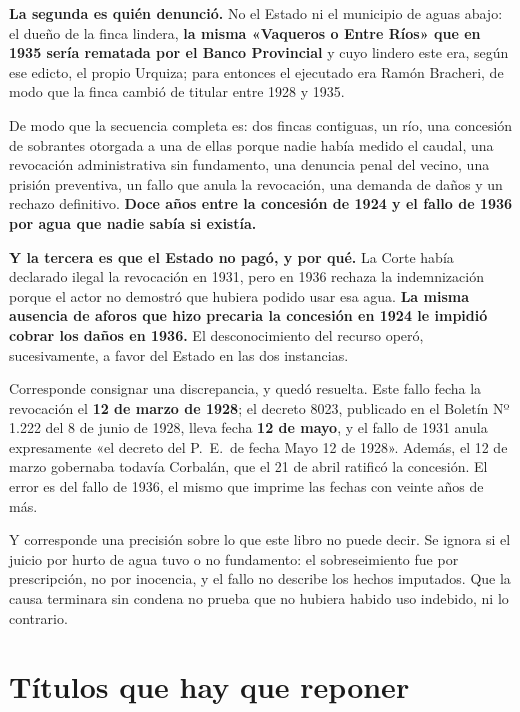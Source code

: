 \textbf{La segunda es quién denunció.} No el Estado ni el municipio de aguas abajo: el dueño
de la finca lindera, \textbf{la misma «Vaqueros o Entre Ríos» que en 1935 sería rematada por
el Banco Provincial} y cuyo lindero este era, según ese edicto, el propio Urquiza; para entonces el ejecutado era Ramón Bracheri, de modo que la finca cambió de titular entre 1928 y 1935.

De modo que la secuencia completa es: dos fincas contiguas, un río, una concesión de
sobrantes otorgada a una de ellas porque nadie había medido el caudal, una revocación administrativa
sin fundamento, una denuncia penal del vecino, una prisión preventiva, un fallo que
anula la revocación, una demanda de daños y un rechazo definitivo. \textbf{Doce años entre la concesión de 1924
y el fallo de 1936 por agua que nadie sabía si existía.}

\textbf{Y la tercera es que el Estado no pagó, y por qué.} La Corte había declarado ilegal la
revocación en 1931, pero en 1936 rechaza la indemnización porque el actor no demostró que
hubiera podido usar esa agua. \textbf{La misma ausencia de aforos que hizo precaria la
concesión en 1924 le impidió cobrar los daños en 1936.} El desconocimiento del recurso operó,
sucesivamente, a favor del Estado en las dos instancias.

\begin{cautela}
Corresponde consignar una discrepancia, y quedó resuelta. Este fallo fecha la revocación el \textbf{12 de marzo
de 1928}; el decreto 8023, publicado en el Boletín Nº 1.222 del 8 de junio de 1928, lleva fecha
\textbf{12 de mayo}, y el fallo de 1931 anula expresamente «el decreto del P.\ E.\ de fecha Mayo 12 de 1928». Además, el 12 de marzo gobernaba todavía Corbalán, que el 21 de abril ratificó la concesión. El error es del fallo de 1936, el mismo que imprime las fechas con veinte años de más.

Y corresponde una precisión sobre lo que este libro no puede decir. Se ignora si el juicio
por hurto de agua tuvo o no fundamento: el sobreseimiento fue por prescripción, no por
inocencia, y el fallo no describe los hechos imputados. Que la causa terminara sin condena no
prueba que no hubiera habido uso indebido, ni lo contrario.
\end{cautela}

\section{Títulos que hay que reponer}

